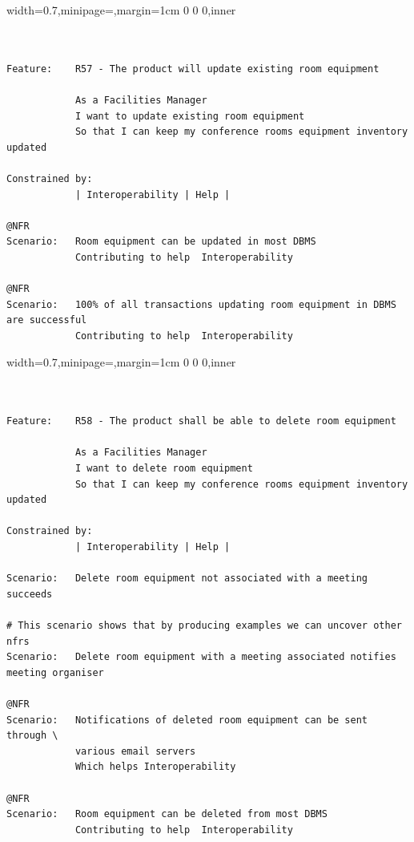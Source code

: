\documentclass[dissertation,final]{softeng}
\newenvironment{featurecode}[1]
{ \lrbox\featurebox \begin{adjustbox}{width=#1\textwidth,minipage=\textwidth,margin=1cm 0 0 0,inner} }
{ \end{adjustbox}\endlrbox}
\newenvironment{featurelist}[2]
{
\newcommand{\setcaption}{\caption{#1}}
\newcommand{\setlabel}{\label{#2}}
}
{\begin{listing}[h!]\centering\usebox\featurebox\setcaption\setlabel\end{listing}}
\begin{document}
\begin{appendices}
\begin{featurelist}{R57 -- The product will update existing room equipment}{lst:feature_r57}
\begin{featurecode}{0.7}
\begin{verbatim}


Feature:    R57 - The product will update existing room equipment

            As a Facilities Manager
            I want to update existing room equipment
            So that I can keep my conference rooms equipment inventory updated
			
Constrained by:
            | Interoperability | Help |

@NFR
Scenario:   Room equipment can be updated in most DBMS
            Contributing to help  Interoperability

@NFR
Scenario:   100% of all transactions updating room equipment in DBMS are successful
            Contributing to help  Interoperability
\end{verbatim}
\end{featurecode}
\end{featurelist}

\begin{featurelist}{R58 -- The product shall be able to delete room equipment}{lst:feature_r58}
\begin{featurecode}{0.7}
\begin{verbatim}


Feature:    R58 - The product shall be able to delete room equipment

            As a Facilities Manager
            I want to delete room equipment
            So that I can keep my conference rooms equipment inventory updated
	
Constrained by:
            | Interoperability | Help |

Scenario:   Delete room equipment not associated with a meeting succeeds

# This scenario shows that by producing examples we can uncover other nfrs
Scenario:   Delete room equipment with a meeting associated notifies meeting organiser

@NFR
Scenario:   Notifications of deleted room equipment can be sent through \
            various email servers	
            Which helps Interoperability

@NFR	
Scenario:   Room equipment can be deleted from most DBMS
            Contributing to help  Interoperability


\end{verbatim}
\end{featurecode}
\end{featurelist}
\end{appendices}
\end{document}
